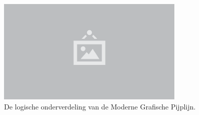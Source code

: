 \begin{figure}
  \centering
  \includegraphics[width=0.8\textwidth]{./img/raw/placeholder.png}
  \caption{De logische onderverdeling van de Moderne Grafische Pijplijn.}
  \label{fig:mgp-conceptueel}
\end{figure}
